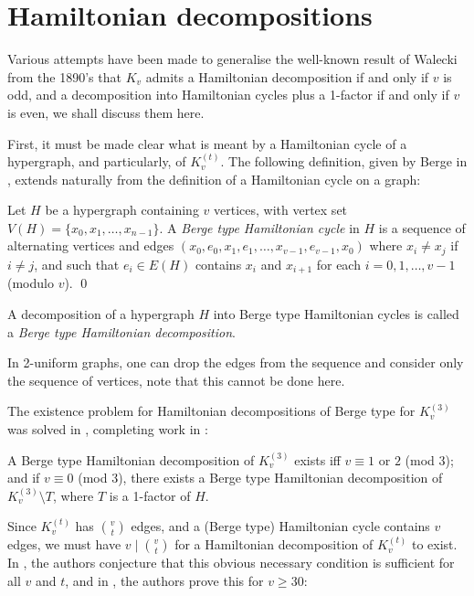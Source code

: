 \section{Hamiltonian decompositions}

Various attempts have been made to generalise the well-known result of Walecki
from the 1890's that $K_v$ admits a Hamiltonian decomposition if and only if
$v$ is odd, and a decomposition into Hamiltonian cycles plus a 1-factor if and
only if $v$ is even, we shall discuss them here.

First, it must be made clear what is meant by a Hamiltonian cycle of a
hypergraph, and particularly, of $K_v^{(t)}$. The following definition,
given by Berge in \cite{berge}, extends naturally from the definition of a
Hamiltonian cycle on a graph:

\begin{definition}
Let $H$ be a hypergraph containing $v$ vertices, with vertex set
$V(H) = \{x_0, x_1, \ldots, x_{n-1}\}$. A {\em Berge type Hamiltonian cycle}
in $H$ is a sequence of alternating vertices and edges $(x_0, e_0, x_1, e_1,
\ldots, x_{v-1}, e_{v-1}, x_0)$ where $x_i \neq x_j$ if $i \neq j$, and such
that $e_i \in E(H)$ contains $x_i$ and $x_{i+1}$ for each $i = 0,1,\ldots,v-1$
(modulo $v$).
\qed
\end{definition}

A decomposition of a hypergraph $H$ into Berge type Hamiltonian cycles is called
a {\em Berge type Hamiltonian decomposition}.

In 2-uniform graphs, one can drop the edges from the sequence and consider only the
sequence of vertices, note that this cannot be done here.

The existence problem for Hamiltonian decompositions of Berge type for
$K_{v}^{(3)}$ was solved in \cite{verall}, completing work in \cite{bermond-al}:

\begin{theorem} \label{berge-hamilton}
A Berge type Hamiltonian decomposition of $K_v^{(3)}$ exists iff $v
\equiv 1$ or $2$ (mod $3$); and if $v \equiv 0$ (mod 3), there exists a
Berge type Hamiltonian decomposition of $K_v^{(3)} \setminus T$, where $T$ is a
1-factor of $H$.
\end{theorem}

Since $K_v^{(t)}$ has $v \choose t$ edges, and a (Berge type) Hamiltonian cycle
contains $v$ edges, we must have $v \mid {v \choose t}$ for a Hamiltonian
decomposition of $K_v^{(t)}$ to exist. In \cite{bermond}, the authors conjecture
that this obvious necessary condition is sufficient for all $v$ and $t$, and in
\cite{kuhn-osthus}, the authors prove this for $v \geq 30$:

